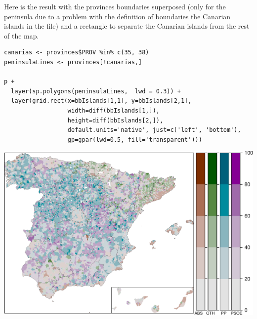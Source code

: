 Here is the result with the provinces boundaries superposed (only for
the peninsula due to a problem with the definition of boundaries the Canarian
islands in the file) and a rectangle to separate the Canarian islands from the
rest of the map.


\lstset{language=R}
\begin{lstlisting}
canarias <- provinces$PROV %in% c(35, 38)
peninsulaLines <- provinces[!canarias,]

p +
  layer(sp.polygons(peninsulaLines,  lwd = 0.3)) +
  layer(grid.rect(x=bbIslands[1,1], y=bbIslands[2,1],
                  width=diff(bbIslands[1,]),
                  height=diff(bbIslands[2,]),
                  default.units='native', just=c('left', 'bottom'),
                  gp=gpar(lwd=0.5, fill='transparent')))
\end{lstlisting}

\includegraphics[width=.9\linewidth]{figs/mapLegends.pdf}
